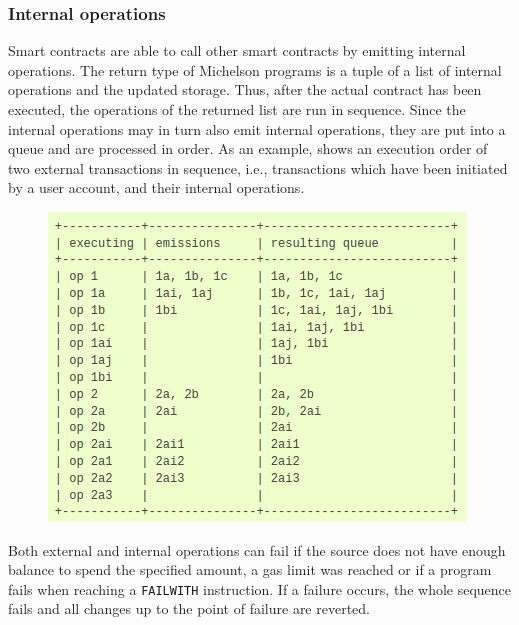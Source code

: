 \subsubsection{Internal operations}
Smart contracts are able to call other smart contracts by emitting internal operations. The return type of Michelson programs is a tuple of a list of internal operations and the updated storage. Thus, after the actual contract has been executed, the operations of the returned list are run in sequence. Since the internal operations may in turn also emit internal operations, they are put into a queue and are processed in order. As an example,  shows an execution order of two external transactions in sequence, i.e., transactions which have been initiated by a user account, and their internal operations.
\begin{figure}[h]
\centering
\includegraphics[width=0.5\linewidth]{figures/5-offline_tezos/internal_ops}
\label{fig:internal_ops}
\end{figure}

Both external and internal operations can fail if the source does not have enough balance to spend the specified amount, a gas limit was reached or if a program fails when reaching a \texttt{FAILWITH} instruction. If a failure occurs, the whole sequence fails and all changes up to the point of failure are reverted.

